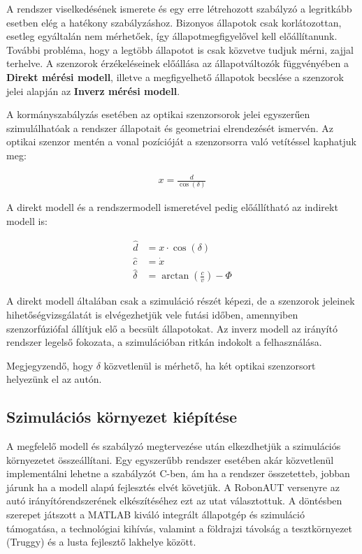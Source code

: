 A rendszer viselkedésének ismerete és egy erre létrehozott szabályzó a legritkább esetben elég a hatékony szabályzáshoz. Bizonyos állapotok csak korlátozottan, esetleg egyáltalán nem mérhetőek, így állapotmegfigyelővel kell előállítanunk. További probléma, hogy a legtöbb állapotot is csak közvetve tudjuk mérni, zajjal terhelve.
A szenzorok érzékeléseinek előállása az állapotváltozók függvényében a \textbf{Direkt mérési modell}, illetve a megfigyelhető állapotok becslése a szenzorok jelei alapján az \textbf{Inverz mérési modell}.

A kormányszabályzás esetében az optikai szenzorsorok jelei egyszerűen szimulálhatóak a rendszer állapotait és geometriai elrendezését ismervén. Az optikai szenzor mentén a vonal pozícióját a szenzorsorra való vetítéssel kaphatjuk meg:

\begin{align}
    x = \frac{d}{\cos(\delta)}
\end{align}

A direkt modell és a rendszermodell ismeretével pedig előállítható az indirekt modell is:

\begin{align}
    \hat{d} &= x \cdot \cos(\delta) \\
    \hat{c} &=\dot{x} \\
    \hat{\delta} &= \arctan \left(\frac{c}{v}\right) - \Phi
\end{align}

A direkt modell általában csak a szimuláció részét képezi, de a szenzorok jeleinek hihetőségvizsgálatát is elvégezhetjük vele futási időben, amennyiben szenzorfúziófal állítjuk elő a becsült állapotokat.
Az inverz modell az irányító rendszer legelső fokozata, a szimulációban ritkán indokolt a felhasználása.

Megjegyzendő, hogy $\delta$ közvetlenül is mérhető, ha két optikai szenzorsort helyezünk el az autón.

\subsection{Szimulációs környezet kiépítése}

A megfelelő modell és szabályzó megtervezése után elkezdhetjük a szimulációs környezetet összeállítani. Egy egyszerűbb rendszer esetében akár közvetlenül implementálni lehetne a szabályzót C-ben, ám ha a rendszer összetetteb, jobban járunk ha a modell alapú fejlesztés elvét követjük. A RobonAUT versenyre az autó irányítórendszerének elkészítéséhez ezt az utat választottuk. A döntésben szerepet játszott a MATLAB kiváló integrált állapotgép és szimuláció támogatása, a technológiai kihívás, valamint a földrajzi távolság a tesztkörnyezet (Truggy) és a lusta fejlesztő lakhelye között.

